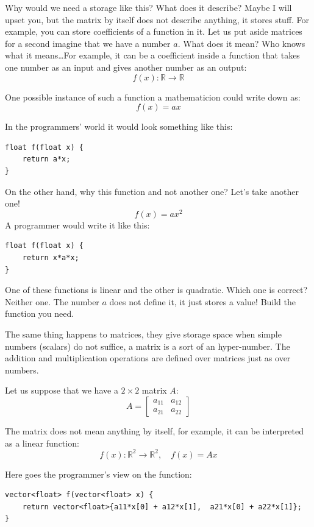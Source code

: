 \documentclass[notitlepage]{report}
\begin{document}
Why would we need a storage like this? What does it describe?
Maybe I will upset you, but the matrix by itself does not describe anything, it stores stuff.
For example, you can store coefficients of a function in it.
Let us put aside matrices for a second imagine that we have a number $a$. What does it mean?
Who knows what it means\dots For example, it can be a coefficient inside a function that takes one number as an input and gives another number as an output:
$$
f(x) : \mathbb R \rightarrow \mathbb R
$$

One possible instance of such a function a mathematicion could write down as:
$$
f(x) = ax
$$

In the programmers' world it would look something like this:
\begin{verbatim}
float f(float x) {
    return a*x;
}
\end{verbatim}

On the other hand, why this function and not another one? Let's take another one!
$$
f(x) = ax^2
$$
A programmer would write it like this:
\begin{verbatim}
float f(float x) {
    return x*a*x;
}
\end{verbatim}

One of these functions is linear and the other is quadratic. Which one is correct? 
Neither one. The number $a$ does not define it, it just stores a value! 
Build the function you need.

The same thing happens to matrices, they give storage space when simple numbers (scalars) do not suffice, a matrix is a sort of an hyper-number.
The addition and multiplication operations are defined over matrices just as over numbers.

Let us suppose that we have a $2\times 2$ matrix $A$:
$$
A=\begin{bmatrix} a_{11} & a_{12} \\ a_{21} & a_{22}\end{bmatrix}
$$

The matrix does not mean anything by itself, for example, it can be interpreted as a linear function:
$$
f(x) : \mathbb R^2 \rightarrow \mathbb R^2, \quad f(x) = Ax
$$

Here goes the programmer's view on the function:
\begin{verbatim}
vector<float> f(vector<float> x) {
    return vector<float>{a11*x[0] + a12*x[1],  a21*x[0] + a22*x[1]};
}
\end{verbatim}
\end{document}
